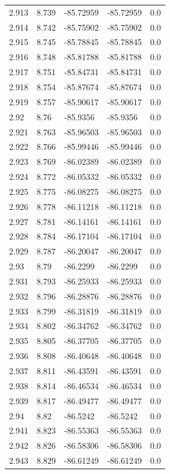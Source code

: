 \begin{tabular}{lllll}
2.913 & 8.739 & -85.72959 & -85.72959 & 0.0 \\
2.914 & 8.742 & -85.75902 & -85.75902 & 0.0 \\
2.915 & 8.745 & -85.78845 & -85.78845 & 0.0 \\
2.916 & 8.748 & -85.81788 & -85.81788 & 0.0 \\
2.917 & 8.751 & -85.84731 & -85.84731 & 0.0 \\
2.918 & 8.754 & -85.87674 & -85.87674 & 0.0 \\
2.919 & 8.757 & -85.90617 & -85.90617 & 0.0 \\
2.92 & 8.76 & -85.9356 & -85.9356 & 0.0 \\
2.921 & 8.763 & -85.96503 & -85.96503 & 0.0 \\
2.922 & 8.766 & -85.99446 & -85.99446 & 0.0 \\
2.923 & 8.769 & -86.02389 & -86.02389 & 0.0 \\
2.924 & 8.772 & -86.05332 & -86.05332 & 0.0 \\
2.925 & 8.775 & -86.08275 & -86.08275 & 0.0 \\
2.926 & 8.778 & -86.11218 & -86.11218 & 0.0 \\
2.927 & 8.781 & -86.14161 & -86.14161 & 0.0 \\
2.928 & 8.784 & -86.17104 & -86.17104 & 0.0 \\
2.929 & 8.787 & -86.20047 & -86.20047 & 0.0 \\
2.93 & 8.79 & -86.2299 & -86.2299 & 0.0 \\
2.931 & 8.793 & -86.25933 & -86.25933 & 0.0 \\
2.932 & 8.796 & -86.28876 & -86.28876 & 0.0 \\
2.933 & 8.799 & -86.31819 & -86.31819 & 0.0 \\
2.934 & 8.802 & -86.34762 & -86.34762 & 0.0 \\
2.935 & 8.805 & -86.37705 & -86.37705 & 0.0 \\
2.936 & 8.808 & -86.40648 & -86.40648 & 0.0 \\
2.937 & 8.811 & -86.43591 & -86.43591 & 0.0 \\
2.938 & 8.814 & -86.46534 & -86.46534 & 0.0 \\
2.939 & 8.817 & -86.49477 & -86.49477 & 0.0 \\
2.94 & 8.82 & -86.5242 & -86.5242 & 0.0 \\
2.941 & 8.823 & -86.55363 & -86.55363 & 0.0 \\
2.942 & 8.826 & -86.58306 & -86.58306 & 0.0 \\
2.943 & 8.829 & -86.61249 & -86.61249 & 0.0 \\

\end{tabular}
